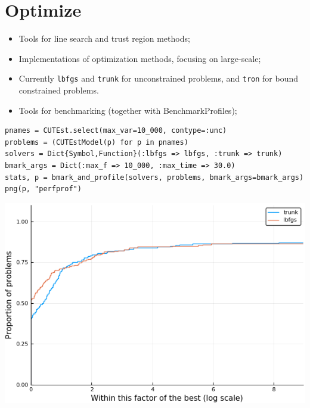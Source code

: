 \section{Optimize}

\begin{frame}[fragile,t]
  \begin{itemize}
    \item Tools for line search and trust region methods;
    \item Implementations of optimization methods, focusing on large-scale;
    \item Currently \verb+lbfgs+ and \verb+trunk+ for unconstrained problems,
      and \verb+tron+ for bound constrained problems.
    \item Tools for benchmarking (together with BenchmarkProfiles);
  \end{itemize}
\begin{lstlisting}
pnames = CUTEst.select(max_var=10_000, contype=:unc)
problems = (CUTEstModel(p) for p in pnames)
solvers = Dict{Symbol,Function}(:lbfgs => lbfgs, :trunk => trunk)
bmark_args = Dict(:max_f => 10_000, :max_time => 30.0)
stats, p = bmark_and_profile(solvers, problems, bmark_args=bmark_args)
png(p, "perfprof")
\end{lstlisting}
\end{frame}

\begin{frame}[fragile,t]
  \begin{center}
    \includegraphics[height=0.75\textheight]{src/perfprof.png}
  \end{center}
\end{frame}

